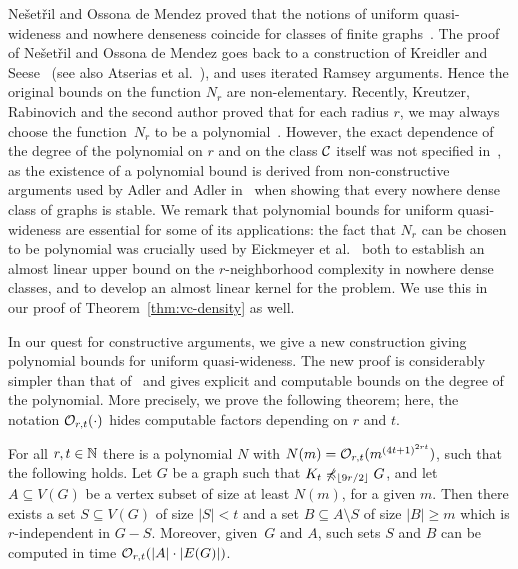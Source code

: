 Ne\v{s}et\v{r}il and Ossona de Mendez proved that
the notions of uniform quasi-wideness and nowhere denseness coincide for 
classes of finite graphs~\cite{nevsetvril2010first}. 
The proof of Ne\v{s}et\v{r}il 
and Ossona de Mendez goes back to a construction
of Kreidler and Seese~\cite{kreidler1998monadic} (see also Atserias et al.~\cite{atserias2006preservation}), 
and uses iterated Ramsey arguments. Hence the original bounds on 
the function $N_r$ are non-elementary. Recently, Kreutzer, Rabinovich and the second author
 proved that for each radius $r$, we may always choose the function~$N_r$ to be a polynomial~\cite{siebertz2016polynomial}. 
 However, the exact 
 dependence of the degree of the polynomial on $r$ and on the class $\mathcal{C}$ itself
 was not specified in~\cite{siebertz2016polynomial}, as the existence of a polynomial bound is derived
from non-constructive arguments used by Adler and Adler in~\cite{adler2014interpreting} when showing that every nowhere dense class of graphs
is stable. We remark that polynomial bounds for uniform quasi-wideness are essential for some of its applications:
the fact that $N_r$ can be chosen to be polynomial was crucially used by Eickmeyer et al.~\cite{eickmeyer2016neighborhood} both to establish an almost linear upper bound on the
$r$-neighborhood complexity in nowhere dense classes, and to develop an almost linear kernel for the {} problem.
We use this %
in our proof of Theorem~\ref{thm:vc-density} as well.

In our quest for constructive arguments, we give a new construction giving polynomial bounds for uniform quasi-wideness.
The new proof is considerably simpler than that of~\cite{siebertz2016polynomial}
and gives explicit and computable bounds on the degree of the polynomial.
More precisely, we prove the following theorem; here, the notation $\mathcal{O}_{r,t}(\cdot)$ hides computable factors depending on $r$ and $t$.

\begin{theorem}\label{thm:new-uqw}
For all $r,t\in \mathbb{N}$ there is a polynomial  $N$%
with $N(m)=
\mathcal{O}_{r,t}{(m^{{(4t+1)}^{2rt}})}$, such that the following holds.
Let $G$ be a graph such that $K_t\not\preccurlyeq_{\lfloor 9r/2\rfloor} G$, and
let $A\subseteq V(G)$ be a vertex subset of size at least $N(m)$, for a given $m$.
Then there exists a set $S\subseteq V(G)$ of size $|S|<t$ and a set $B\subseteq A\setminus S$ 
of size $|B|\geq m$ which is $r$-independent in $G-S$.
Moreover, given~$G$ and $A$, such sets $S$ and $B$ can be computed in time $\mathcal{O}_{r,t}(|A|\cdot |E(G)|)$. 
\end{theorem}

